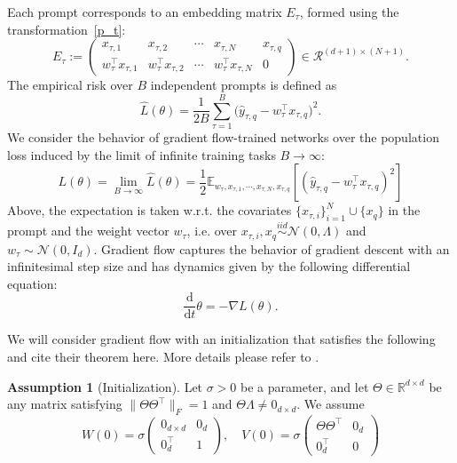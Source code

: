 \documentclass{article}
\theoremstyle{plain}
\theoremstyle{definition}
\newtheorem{assumption}[theorem]{Assumption}
\theoremstyle{remark}
\begin{document}
Each prompt corresponds to an embedding matrix $E_\tau$, formed using the transformation~\eqref{p_t}:
\begin{equation*}
    E_\tau := \begin{pmatrix}
    x_{\tau,1} & x_{\tau,2} & \cdots & x_{\tau,N} & x_{\tau,q} \\
    w_\tau^\top x_{\tau,1} & w_\tau^\top x_{\tau,2} & \cdots & w_\tau^\top x_{\tau,N} & 0
\end{pmatrix} \in \mathcal{R}^{(d+1)\times (N+1)}.
\end{equation*}
The empirical risk over $B$ independent prompts is defined as
\begin{equation}\label{eqn:emp_loss_maintext}
    \widehat L(\theta) = \frac{1}{2B} \sum_{\tau=1}^B \bigg(\widehat y_{\tau,q} - w_\tau^\top x_{\tau,q}\bigg)^2.
\end{equation}
We consider the behavior of gradient flow-trained networks over the population loss induced by the limit of infinite training tasks $B\to \infty$:
\begin{equation}\label{eqn:population_loss}
    L(\theta) = \lim_{B\to \infty} \widehat L(\theta) = \frac{1}{2} \mathbb{E}_{w_\tau, x_{\tau,1}, \cdots, x_{\tau,N}, x_{\tau,q}} \left[ (\widehat y_{\tau,q} - w_\tau^\top x_{\tau,q})^2 \right]
\end{equation}
Above, the expectation is taken w.r.t. the covariates $\{x_{\tau,i}\}_{i=1}^N \cup \{x_{q}\}$ in the prompt and the weight vector $w_\tau$, i.e. over $x_{\tau,i},x_q \overset{iid}{\sim} \mathcal{N}(0, \Lambda)$ and $w_{\tau} \sim \mathcal{N}(0,I_d)$.  
Gradient flow captures the behavior of gradient descent with an infinitesimal step size and has dynamics given by the following differential equation:
\begin{equation}\label{eqn:gf}
    \frac{\mathrm{d}}{\mathrm dt} \theta = - \nabla L(\theta).
\end{equation}

We will consider gradient flow with an initialization that satisfies the following and cite their theorem here. More details please refer to \citet{zhang2024trained}.
\begin{assumption}[Initialization]
\label{initialization}
    Let $\sigma>0$ be a parameter, and let $\Theta\in \mathbb{R}^{d\times d}$ be any matrix satisfying $\|\Theta\Theta^\top\|_{F}=1$ and $\Theta\Lambda\ne0_{d\times d}$. We assume
    \begin{equation}
        W(0) = \sigma\begin{pmatrix}
  0_{d\times d}&0_d \\
  0^\top_d&1
\end{pmatrix},\quad V(0)=\sigma\begin{pmatrix}
  \Theta\Theta^\top&0_d \\
  0^\top_d&0
\end{pmatrix}
    \end{equation}
\end{assumption}
\end{document}
